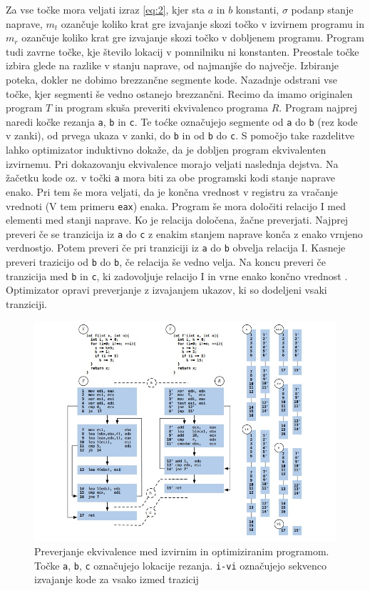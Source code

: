 \documentclass[a4paper, 12pt]{book}
\begin{document}
	 Za vse točke mora veljati izraz \ref{eq:2}, kjer sta $a$ in $b$ konstanti, $\sigma$ podanp stanje naprave, $m_t$ ozančuje koliko krat gre izvajanje skozi točko v izvirnem programu in $m_r$ ozančuje koliko krat gre izvajanje skozi točko v dobljenem programu. Program tudi zavrne točke, kje število lokacij v pomnilniku ni konstanten. Preostale točke izbira glede na razlike v stanju naprave, od najmanjše do največje. Izbiranje poteka, dokler ne dobimo brezzančne segmente kode. Nazadnje odstrani vse točke, kjer segmenti še vedno ostanejo brezzančni. Recimo da imamo originalen program $T$ in program skuša preveriti ekvivalenco programa $R$. Program najprej naredi kočke rezanja \texttt{a}, \texttt{b} in \texttt{c}. Te toćke označujejo segmente od \texttt{a} do \texttt{b} (rez kode v zanki), od prvega ukaza v zanki, do \texttt{b} in od \texttt{b} do \texttt{c}. S pomočjo take razdelitve lahko optimizator induktivno dokaže, da je dobljen program ekvivalenten izvirnemu. Pri dokazovanju ekvivalence morajo veljati naslednja dejstva. Na žačetku kode oz. v točki \texttt{a} mora biti za obe programski kodi stanje naprave enako. Pri tem še mora veljati, da je končna vrednost v registru za vračanje vrednoti (V tem primeru \texttt{eax}) enaka. Program še mora določiti relacijo I med elementi med stanji naprave. Ko je relacija določena, žačne preverjati. Najprej preveri če se tranzicija iz \texttt{a} do \texttt{c} z enakim stanjem naprave konča z enako vrnjeno verdnostjo. Potem preveri če pri tranziciji iz \texttt{a} do \texttt{b} obvelja relacija I. Kasneje preveri trazicijo od \texttt{b} do \texttt{b}, če relacija še vedno velja. Na koncu preveri če tranzicija med \texttt{b} in \texttt{c}, ki zadovoljuje relacijo I in vrne enako končno vrednost \cite{sto}. Optimizator opravi preverjanje z izvajanjem ukazov, ki so dodeljeni vsaki tranziciji.
	
	\begin{figure}[htb]
		\begin{center}
			\includegraphics[width=15cm]{graf1.jpg}
		\end{center}
		\caption{Preverjanje ekvivalence med izvirnim in optimiziranim programom. Točke \texttt{a}, \texttt{b}, \texttt{c} označujejo lokacije rezanja. \texttt{i-vi} označujejo sekvenco izvajanje kode za vsako izmed trazicij}
		\label{pic1}
	\end{figure}
	
\end{document}
